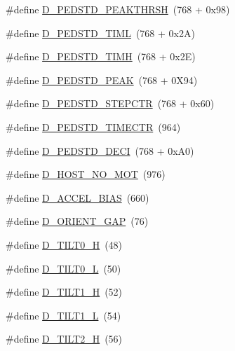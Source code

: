 \begin{DoxyCompactItemize}
\item 
\#define \hyperlink{group___d_r_i_v_e_r_s_ga3b281a8de65d0ac3ed6321b4df4ab6d0}{D\+\_\+\+P\+E\+D\+S\+T\+D\+\_\+\+P\+E\+A\+K\+T\+H\+R\+SH}~(768 + 0x98)
\item 
\#define \hyperlink{group___d_r_i_v_e_r_s_ga1968b4f2f2daece7e19a24bad6388864}{D\+\_\+\+P\+E\+D\+S\+T\+D\+\_\+\+T\+I\+ML}~(768 + 0x2\+A)
\item 
\#define \hyperlink{group___d_r_i_v_e_r_s_ga3c410f5ee95cf78486e71a276ed8b36a}{D\+\_\+\+P\+E\+D\+S\+T\+D\+\_\+\+T\+I\+MH}~(768 + 0x2\+E)
\item 
\#define \hyperlink{group___d_r_i_v_e_r_s_ga1e71c4f2fc11aa787bd4c8a5a4126525}{D\+\_\+\+P\+E\+D\+S\+T\+D\+\_\+\+P\+E\+AK}~(768 + 0\+X94)
\item 
\#define \hyperlink{group___d_r_i_v_e_r_s_ga4925c8f2bfe6e2698c10bf5b1094dc54}{D\+\_\+\+P\+E\+D\+S\+T\+D\+\_\+\+S\+T\+E\+P\+C\+TR}~(768 + 0x60)
\item 
\#define \hyperlink{group___d_r_i_v_e_r_s_gaee461dfb8a3fcd18ea6dddeaba63457b}{D\+\_\+\+P\+E\+D\+S\+T\+D\+\_\+\+T\+I\+M\+E\+C\+TR}~(964)
\item 
\#define \hyperlink{group___d_r_i_v_e_r_s_gae84f6c1fd0f4ccc0f0b5aedc01d48636}{D\+\_\+\+P\+E\+D\+S\+T\+D\+\_\+\+D\+E\+CI}~(768 + 0x\+A0)
\item 
\#define \hyperlink{group___d_r_i_v_e_r_s_ga0ee24f50eee31a512b652647521d24bb}{D\+\_\+\+H\+O\+S\+T\+\_\+\+N\+O\+\_\+\+M\+OT}~(976)
\item 
\#define \hyperlink{group___d_r_i_v_e_r_s_ga2cc522b8f621f32418257ab61144a744}{D\+\_\+\+A\+C\+C\+E\+L\+\_\+\+B\+I\+AS}~(660)
\item 
\#define \hyperlink{group___d_r_i_v_e_r_s_gac74c2352245609d469f38d6ffff9030e}{D\+\_\+\+O\+R\+I\+E\+N\+T\+\_\+\+G\+AP}~(76)
\item 
\#define \hyperlink{group___d_r_i_v_e_r_s_ga214de0f949e6ed8fcf11ce1b3b6eebad}{D\+\_\+\+T\+I\+L\+T0\+\_\+H}~(48)
\item 
\#define \hyperlink{group___d_r_i_v_e_r_s_ga6c85fceb5f74a918b0399d0307158ff7}{D\+\_\+\+T\+I\+L\+T0\+\_\+L}~(50)
\item 
\#define \hyperlink{group___d_r_i_v_e_r_s_ga4e1a6f62758ed17f6f950a15dae3f71f}{D\+\_\+\+T\+I\+L\+T1\+\_\+H}~(52)
\item 
\#define \hyperlink{group___d_r_i_v_e_r_s_ga4e42a147afc872019b8affbbe545e233}{D\+\_\+\+T\+I\+L\+T1\+\_\+L}~(54)
\item 
\#define \hyperlink{group___d_r_i_v_e_r_s_ga9325b74799bbe82c52821c1a3d31cb0a}{D\+\_\+\+T\+I\+L\+T2\+\_\+H}~(56)

\end{DoxyCompactItemize}
